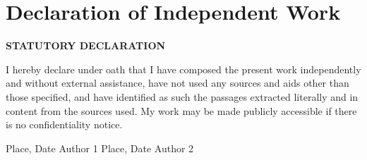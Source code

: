 \chapter*{Declaration of Independent Work}
\label{cha:affirmation}


\textbf{STATUTORY DECLARATION}
\vspace{1cm}

I hereby declare under oath that I have composed the present work independently and without external assistance, have not used any sources and aids other than those specified, and have identified as such the passages extracted literally and in content from the sources used. My work may be made publicly accessible if there is no confidentiality notice.

\vfill\vfill



Place, Date  \hspace{5cm}Author 1     
\vfill    
Place, Date  \hspace{5cm}Author 2       